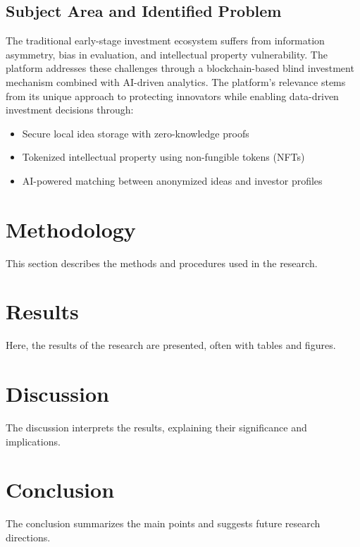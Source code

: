 \documentclass[12pt]{article}
\begin{document}
\subsection{Subject Area and Identified Problem}
The traditional early-stage investment ecosystem suffers from information asymmetry, bias in evaluation, and intellectual property vulnerability. The platform addresses these challenges through a blockchain-based blind investment mechanism combined with AI-driven analytics. The platform's relevance stems from its unique approach to protecting innovators while enabling data-driven investment decisions through:
\begin{itemize}
  \item Secure local idea storage with zero-knowledge proofs
  \item Tokenized intellectual property using non-fungible tokens (NFTs)
  \item AI-powered matching between anonymized ideas and investor profiles
\end{itemize}


\section{Methodology}
This section describes the methods and procedures used in the research.

\section{Results}
Here, the results of the research are presented, often with tables and figures.

\section{Discussion}
The discussion interprets the results, explaining their significance and implications.

\section{Conclusion}
The conclusion summarizes the main points and suggests future research directions.



\end{document}
